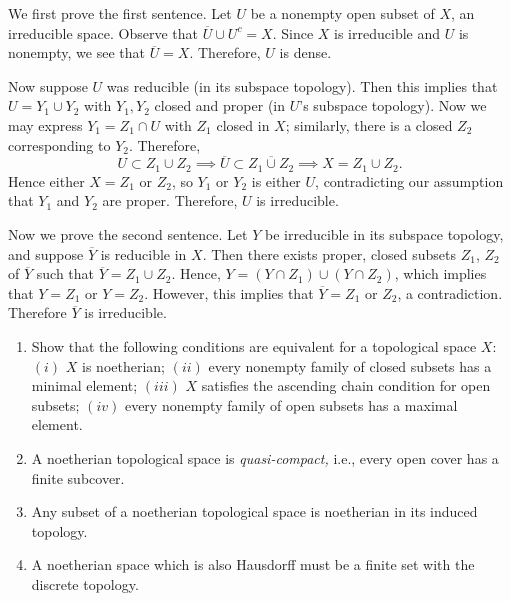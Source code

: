 \documentclass[10pt]{amsart}
\begin{document}
\begin{solution}
    \begin{luke}
        We first prove the first sentence.
        Let $U$ be a nonempty open subset of $X$, an irreducible space. 
        Observe that $\overline{U} \cup U^c = X$. Since $X$ is irreducible and $U$ 
        is nonempty, we see that $\overline{U} = X$. Therefore, $U$ is dense.
    
        Now suppose $U$ was reducible (in its subspace topology). Then this implies that 
        $U = Y_1 \cup Y_2$ with $Y_1, Y_2$ closed and proper (in $U$'s subspace topology). 
        Now we may express $Y_1 = Z_1 \cap U$ with $Z_1$ closed in $X$; similarly, there is a closed $Z_2$ corresponding 
        to $Y_2$. Therefore, 
        \[
            U \subset Z_1 \cup Z_2 \implies \overline{U} \subset \overline{Z_1 \cup Z_2} \implies 
            X = Z_1 \cup Z_2.        
        \]
        Hence either $X = Z_1$ or $Z_2$, so $Y_1$ or $Y_2$ is either $U$, contradicting our 
        assumption that $Y_1$ and $Y_2$ are proper. Therefore, $U$ is irreducible. 
    
        Now we prove the second sentence. Let $Y$ be irreducible in its subspace topology, and 
        suppose $\overline{Y}$ is reducible in $X$. Then there exists proper, closed subsets 
        $Z_1$, $Z_2$ of $\overline{Y}$ such that $\overline{Y} = Z_1 \cup Z_2$. Hence, 
        $Y = (Y \cap Z_1) \cup (Y \cap Z_2)$, which implies that $Y = Z_1$ 
        or $Y = Z_2$. However, this implies that $\overline{Y} = Z_1$ or $Z_2$, a contradiction. 
        Therefore $\overline{Y}$ is irreducible. 
    \end{luke}

\end{solution}

\begin{exercise}[1.7]
    \begin{enumerate}
        \item Show that the following conditions are equivalent for a topological
        space $X$: $(i)$ $X$ is noetherian; $(ii)$ every nonempty family of
        closed subsets has a minimal element; $(iii)$ $X$ satisfies the ascending
        chain condition for open subsets; $(iv)$ every nonempty family of open
        subsets has a maximal element.
      \item A noetherian topological space is \emph{quasi-compact,} i.e., every
        open cover has a finite subcover.
      \item Any subset of a noetherian topological space is noetherian in its
        induced topology.
      \item A noetherian space which is also Hausdorff must be a finite set with
        the discrete topology.    
    \end{enumerate}
\end{exercise}
\end{document}
